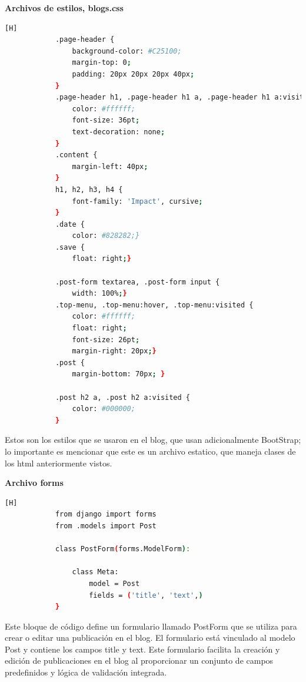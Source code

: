 \documentclass{article}
\begin{document}
        \item \textbf{Archivos de estilos, blogs.css}
        \begin{lstlisting}[language=bash,caption={blog.css}][H]
            .page-header {
                background-color: #C25100;
                margin-top: 0;
                padding: 20px 20px 20px 40px;
            }
            .page-header h1, .page-header h1 a, .page-header h1 a:visited, .page-header h1 a:active {
                color: #ffffff;
                font-size: 36pt;
                text-decoration: none;
            }
            .content {
                margin-left: 40px;
            }
            h1, h2, h3, h4 {
                font-family: 'Impact', cursive;
            }
            .date {
                color: #828282;}
            .save {
                float: right;}
            
            .post-form textarea, .post-form input {
                width: 100%;}
            .top-menu, .top-menu:hover, .top-menu:visited {
                color: #ffffff;
                float: right;
                font-size: 26pt;
                margin-right: 20px;}
            .post {
                margin-bottom: 70px; }
            
            .post h2 a, .post h2 a:visited {
                color: #000000;
            }
	\end{lstlisting}
        Estos son los estilos que se usaron en el blog, que usan adicionalmente BootStrap; lo importante es mencionar que este es un archivo estatico, que maneja clases de los html anteriormente vistos.

        \item \textbf{Archivo forms}
        \begin{lstlisting}[language=bash,caption={forms.py}][H]
            from django import forms
            from .models import Post
            
            class PostForm(forms.ModelForm):
            
                class Meta:
                    model = Post
                    fields = ('title', 'text',)
            }
	\end{lstlisting}
        Este bloque de código define un formulario llamado PostForm que se utiliza para crear o editar una publicación en el blog. El formulario está vinculado al modelo Post y contiene los campos title y text. Este formulario facilita la creación y edición de publicaciones en el blog al proporcionar un conjunto de campos predefinidos y lógica de validación integrada.\newline\newline
\end{document}
